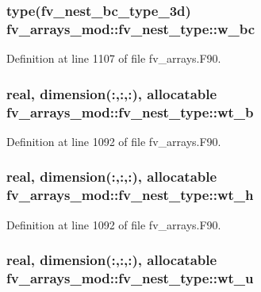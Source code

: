 \subsubsection[{w\-\_\-bc}]{\setlength{\rightskip}{0pt plus 5cm}type({\bf fv\-\_\-nest\-\_\-bc\-\_\-type\-\_\-3d}) fv\-\_\-arrays\-\_\-mod\-::fv\-\_\-nest\-\_\-type\-::w\-\_\-bc}\label{structfv__arrays__mod_1_1fv__nest__type_a91ca658afc2467a244897e03517ddf75}


Definition at line 1107 of file fv\-\_\-arrays.\-F90.

\subsubsection[{wt\-\_\-b}]{\setlength{\rightskip}{0pt plus 5cm}real, dimension(\-:,\-:,\-:), allocatable fv\-\_\-arrays\-\_\-mod\-::fv\-\_\-nest\-\_\-type\-::wt\-\_\-b}\label{structfv__arrays__mod_1_1fv__nest__type_aba478e4a4f147f23e80db3856a243724}


Definition at line 1092 of file fv\-\_\-arrays.\-F90.

\subsubsection[{wt\-\_\-h}]{\setlength{\rightskip}{0pt plus 5cm}real, dimension(\-:,\-:,\-:), allocatable fv\-\_\-arrays\-\_\-mod\-::fv\-\_\-nest\-\_\-type\-::wt\-\_\-h}\label{structfv__arrays__mod_1_1fv__nest__type_af5fdff5fb218822f5644bc4f4f259ea8}


Definition at line 1092 of file fv\-\_\-arrays.\-F90.

\subsubsection[{wt\-\_\-u}]{\setlength{\rightskip}{0pt plus 5cm}real, dimension(\-:,\-:,\-:), allocatable fv\-\_\-arrays\-\_\-mod\-::fv\-\_\-nest\-\_\-type\-::wt\-\_\-u}\label{structfv__arrays__mod_1_1fv__nest__type_adeb1401d97eaf79d1c981c5d7bd9c9aa}


